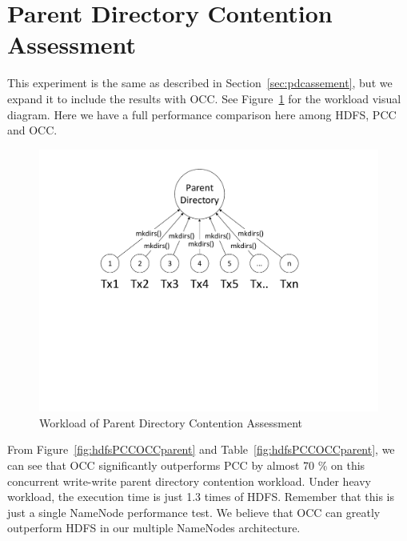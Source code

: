 \section{Parent Directory Contention Assessment}
\label{sec:ww}

This experiment is the same as described in Section~\ref{sec:pdcassement}, but we expand it to include the results with OCC. See Figure~\ref{fig:hdfsPCCOCCparentDiragram} for the workload visual diagram. Here we have a full performance comparison here among HDFS, PCC and OCC.

\begin{figure}[ht]
	\centering
	\includegraphics[scale=0.6]{figs/ww.pdf}
	\caption{Workload of Parent Directory Contention Assessment}
	\label{fig:hdfsPCCOCCparentDiragram}
\end{figure}

\noindent From Figure~\ref{fig:hdfsPCCOCCparent} and Table~\ref{fig:hdfsPCCOCCparent}, we can see that OCC significantly outperforms PCC by almost 70 \% on this concurrent write-write parent directory contention workload. Under heavy workload, the execution time is just 1.3 times of HDFS. Remember that this is just a single NameNode performance test. We believe that OCC can greatly outperform HDFS in our multiple NameNodes architecture.

